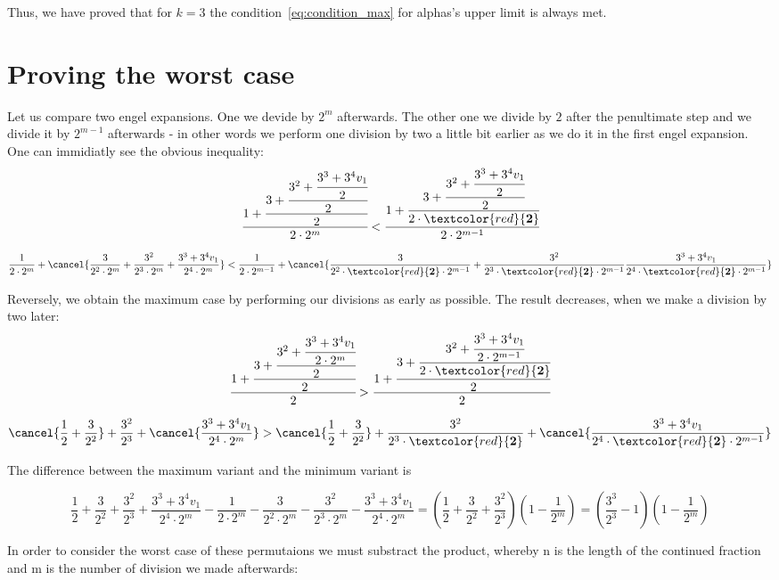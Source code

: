 Thus, we have proved that for $k=3$ the condition~\ref{eq:condition_max} for alphas's upper limit is always met.

\section{Proving the worst case}
Let us compare two engel expansions. One we devide by $2^m$ afterwards. The other one we divide by $2$ after the penultimate step and we divide it by $2^{m-1}$ afterwards - in other words we perform one division by two a little bit earlier as we do it in the first engel expansion. One can immidiatly see the obvious inequality:
\[
\cfrac{1+\cfrac{3+\cfrac{3^2+\cfrac{3^3+3^4v_1}{2}}{2}}{2}}{2\cdot2^m}
<
\cfrac{1+\cfrac{3+\cfrac{3^2+\cfrac{3^3+3^4v_1}{2}}{2}}{2\cdot\textcolor{red}{\mathbf{2}}}}{2\cdot2^{m-1}}
\]

\[
\frac{1}{2\cdot2^m}+\cancel{\frac{3}{2^2\cdot2^m}+\frac{3^2}{2^3\cdot2^m}+\frac{3^3+3^4v_1}{2^4\cdot2^m}}
<
\frac{1}{2\cdot2^{m-1}}+\cancel{\frac{3}{2^2\cdot\textcolor{red}{\mathbf{2}}\cdot2^{m-1}}+\frac{3^2}{2^3\cdot\textcolor{red}{\mathbf{2}}\cdot2^{m-1}}\frac{3^3+3^4v_1}{2^4\cdot\textcolor{red}{\mathbf{2}}\cdot2^{m-1}}}
\]

Reversely, we obtain the maximum case by performing our divisions as early as possible. The result decreases, when we make a division by two later:
\[
\cfrac{1+\cfrac{3+\cfrac{3^2+\cfrac{3^3+3^4v_1}{2\cdot2^m}}{2}}{2}}{2}
>
\cfrac{1+\cfrac{3+\cfrac{3^2+\cfrac{3^3+3^4v_1}{2\cdot2^{m-1}}}{2\cdot\textcolor{red}{\mathbf{2}}}}{2}}{2}
\]

\[
\cancel{\frac{1}{2}+\frac{3}{2^2}}+\frac{3^2}{2^3}+\cancel{\frac{3^3+3^4v_1}{2^4\cdot2^m}}
>
\cancel{\frac{1}{2}+\frac{3}{2^2}}+\frac{3^2}{2^3\cdot\textcolor{red}{\mathbf{2}}}+\cancel{\frac{3^3+3^4v_1}{2^4\cdot\textcolor{red}{\mathbf{2}}\cdot2^{m-1}}}
\]

The difference between the maximum variant and the minimum variant is

\[
\frac{1}{2}+\frac{3}{2^2}+\frac{3^2}{2^3}+\frac{3^3+3^4v_1}{2^4\cdot2^m}-\frac{1}{2\cdot2^m}-\frac{3}{2^2\cdot2^m}-\frac{3^2}{2^3\cdot2^m}-\frac{3^3+3^4v_1}{2^4\cdot2^m}=\left(\frac{1}{2}+\frac{3}{2^2}+\frac{3^2}{2^3}\right)\left(1-\frac{1}{2^m}\right)=\left(\frac{3^3}{2^3}-1\right)\left(1-\frac{1}{2^m}\right)
\]

In order to consider the worst case of these permutaions we must substract the product, whereby n is the length of the continued fraction and m is the number of division we made afterwards:

